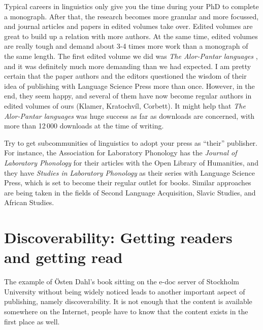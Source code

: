 \documentclass[guidelines,nonflat,modfonts] {langsci/langscibook}
\begin{document}
Typical careers in linguistics only give you the time during your PhD to complete a monograph. After that, the research becomes more granular and more focussed, and journal articles and papers in edited volumes take over. Edited volumes are great to build up a relation with more authors. At the same time, edited volumes are really tough and demand about 3-4 times more work than a monograph of the same length. The first edited volume we did was \textit{The Alor-Pantar languages} \citep{Klamer2014}, and it was definitely much more demanding than we had expected. I am pretty certain that the paper authors and the editors questioned the wisdom of their idea of publishing with Language Science Press more than once. However, in the end, they seem happy, and several of them have now become regular authors in edited volumes of ours (Klamer, Kratochvíl, Corbett). It might help that \textit{The Alor-Pantar languages} was  huge success as far as downloads are concerned, with more than 12\,000 downloads at the time of writing. 

Try to get subcommunities of linguistics to adopt your press as ``their'' publisher. For instance, the {Association for Laboratory Phonology} has the \textit{Journal of Laboratory Phonology} for their articles with the Open Library of Humanities, and they have \textit{Studies in Laboratory Phonology} as their series with Language Science Press, which is set to become their regular outlet for books. Similar approaches are being taken in the fields of Second Language Acquisition, Slavic Studies, and African Studies. 

\section{Discoverability: Getting readers and getting read}\label{sec:discoverability} 
The example of Östen Dahl's book sitting on the e-doc server of Stockholm University without being widely noticed leads to another important aspect of publishing, namely discoverability. It is not enough that the content is available somewhere on the Internet, people have to know that the content exists in the first place as well. 
\end{document}

